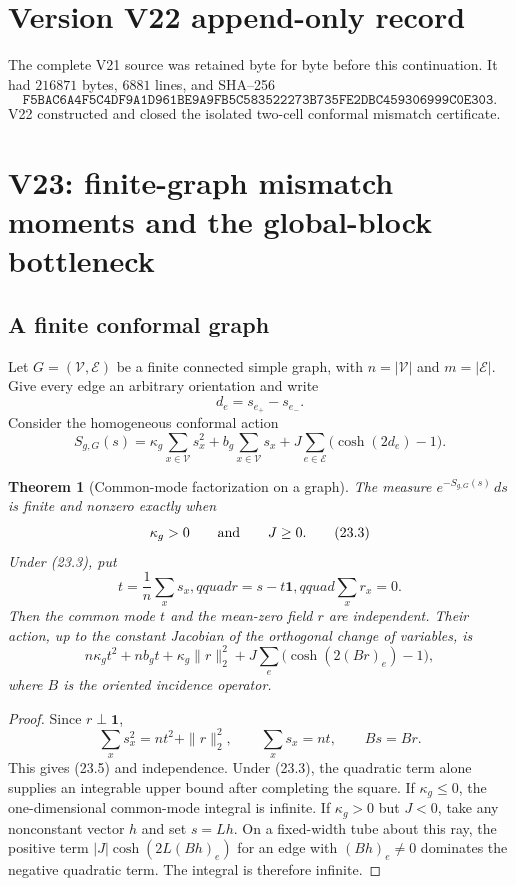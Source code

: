 \documentclass[11pt]{article}
\newtheorem{theorem}{Theorem}[section]
\theoremstyle{remark}
\begin{document}
\section*{Version V22 append-only record}
The complete V21 source was retained byte for byte before this
continuation.  It had \(216871\) bytes, \(6881\) lines, and SHA--256
\[
 \texttt{F5BAC6A4F5C4DF9A1D961BE9A9FB5C583522273B735FE2DBC459306999C0E303}.
\]
V22 constructed and closed the isolated two-cell conformal mismatch
certificate.


\section{V23: finite-graph mismatch moments and the global-block bottleneck}
\label{sec:v17v23}

\subsection{A finite conformal graph}

Let \(G=(\mathcal V,\mathcal E)\) be a finite connected simple graph,
with \(n=|\mathcal V|\) and \(m=|\mathcal E|\).  Give every edge an
arbitrary orientation and write
\[
 d_e=s_{e_+}-s_{e_-}.                              \tag{23.1}
\]
Consider the homogeneous conformal action
\[
 S_{g,G}(s)
 =\kappa_g\sum_{x\in\mathcal V}s_x^2
 +b_g\sum_{x\in\mathcal V}s_x
 +J\sum_{e\in\mathcal E}\bigl(\cosh(2d_e)-1\bigr).
                                                               \tag{23.2}
\]

\begin{theorem}[Common-mode factorization on a graph]
\label{thm:v17v23-common}
The measure \(e^{-S_{g,G}(s)}\,ds\) is finite and nonzero exactly when
\[
 \kappa_g>0\qquad\hbox{and}\qquad J\geq0.           \tag{23.3}
\]
Under (23.3), put
\[
 t=\frac1n\sum_xs_x,qquad r=s-t\mathbf1,qquad
 \sum_xr_x=0.                                     \tag{23.4}
\]
Then the common mode \(t\) and the mean-zero field \(r\) are
independent.  Their action, up to the constant Jacobian of the
orthogonal change of variables, is
\[
 n\kappa_gt^2+nb_gt
 +\kappa_g\|r\|_2^2
 +J\sum_e\bigl(\cosh(2(B r)_e)-1\bigr),            \tag{23.5}
\]
where \(B\) is the oriented incidence operator.
\end{theorem}

\begin{proof}
Since \(r\perp\mathbf1\),
\[
 \sum_xs_x^2=nt^2+\|r\|_2^2,
 \qquad \sum_xs_x=nt,
 \qquad Bs=Br.                                    \tag{23.6}
\]
This gives (23.5) and independence.  Under (23.3), the quadratic term
alone supplies an integrable upper bound after completing the square.
If \(\kappa_g\leq0\), the one-dimensional common-mode integral is
infinite.  If \(\kappa_g>0\) but \(J<0\), take any nonconstant vector
\(h\) and set \(s=Lh\).  On a fixed-width tube about this ray, the
positive term \(|J|\cosh(2L(Bh)_e)\) for an edge with
\((Bh)_e\ne0\) dominates the negative quadratic term.  The integral is
therefore infinite.
\end{proof}
\end{document}
